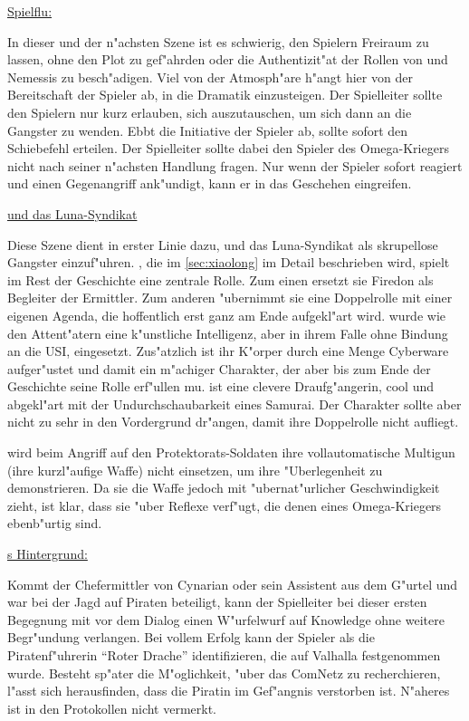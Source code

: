 \vfill

\begin{remarks}
	\underline{Spielflu\3:}
	
	In dieser und der n"achsten Szene ist es schwierig, den Spielern Freiraum zu lassen, ohne den Plot zu gef"ahrden oder die Authentizit"at der Rollen von \xl{} und Nemessis zu besch"adigen. Viel von der Atmosph"are h"angt hier von der Bereitschaft der Spieler ab, in die Dramatik einzusteigen. Der Spielleiter sollte den Spielern nur kurz erlauben, sich auszutauschen, um sich dann an die Gangster zu wenden. Ebbt die Initiative der Spieler ab, sollte \xl{} sofort den Schie\3befehl erteilen. Der Spielleiter sollte dabei den Spieler des Omega-Kriegers nicht nach seiner n"achsten Handlung fragen. Nur wenn der Spieler sofort reagiert und einen Gegenangriff ank"undigt, kann er in das Geschehen eingreifen.

	\underline{\xl{} und das Luna-Syndikat}

	Diese Szene dient in erster Linie dazu, \xl{} und das Luna-Syndikat als skrupellose Gangster einzuf"uhren. \xl{}, die im \cref{sec:xiaolong} im Detail beschrieben wird, spielt im Rest der Geschichte eine zentrale Rolle. Zum einen ersetzt sie Firedon als Begleiter der Ermittler. Zum anderen "ubernimmt sie eine Doppelrolle mit einer eigenen Agenda, die hoffentlich erst ganz am Ende aufgekl"art wird. \xl{} wurde wie den Attent"atern eine k"unstliche Intelligenz, aber in ihrem Falle ohne Bindung an die USI, eingesetzt. Zus"atzlich ist ihr K"orper durch eine Menge Cyberware aufger"ustet und damit ein m"achiger Charakter, der aber bis zum Ende der Geschichte seine Rolle erf"ullen mu\3. \xl{} ist eine clevere Draufg"angerin, cool und abgekl"art mit der Undurchschaubarkeit
	eines Samurai. Der Charakter sollte aber nicht zu sehr in den Vordergrund dr"angen, damit ihre Doppelrolle nicht aufliegt.

	\xl{} wird beim Angriff auf den Protektorats-Soldaten ihre vollautomatische Multigun (ihre kurzl"aufige Waffe) nicht einsetzen, um ihre "Uberlegenheit zu demonstrieren. Da sie die Waffe jedoch mit "ubernat"urlicher Geschwindigkeit zieht, ist klar, dass sie "uber Reflexe verf"ugt, die denen eines Omega-Kriegers ebenb"urtig sind.

	\underline{\xl{}s Hintergrund:}

	Kommt der Chefermittler von Cynarian oder sein Assistent aus dem G"urtel und war bei der Jagd auf Piraten beteiligt, kann der Spielleiter bei dieser ersten Begegnung mit \xl{} vor dem Dialog einen W"urfelwurf auf Knowledge ohne weitere Begr"undung verlangen. Bei vollem Erfolg kann der Spieler \xl{} als die Piratenf"uhrerin "`Roter Drache"' identifizieren, die auf Valhalla festgenommen wurde. Besteht sp"ater die M"oglichkeit, "uber das ComNetz zu recherchieren, l"asst sich herausfinden, dass die Piratin im Gef"angnis verstorben ist. N"aheres ist in den Protokollen nicht vermerkt.
\end{remarks}


